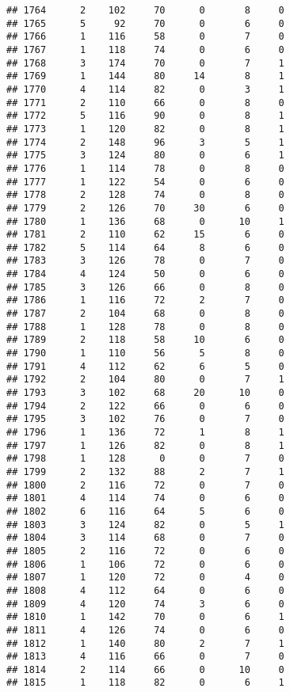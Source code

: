 \documentclass[
]{article}
\begin{document}
\begin{verbatim}
## 1764      2    102     70      0       8     0
## 1765      5     92     70      0       6     0
## 1766      1    116     58      0       7     0
## 1767      1    118     74      0       6     0
## 1768      3    174     70      0       7     1
## 1769      1    144     80     14       8     1
## 1770      4    114     82      0       3     1
## 1771      2    110     66      0       8     0
## 1772      5    116     90      0       8     1
## 1773      1    120     82      0       8     1
## 1774      2    148     96      3       5     1
## 1775      3    124     80      0       6     1
## 1776      1    114     78      0       8     0
## 1777      1    122     54      0       6     0
## 1778      2    128     74      0       8     0
## 1779      2    126     70     30       6     0
## 1780      1    136     68      0      10     1
## 1781      2    110     62     15       6     0
## 1782      5    114     64      8       6     0
## 1783      3    126     78      0       7     0
## 1784      4    124     50      0       6     0
## 1785      3    126     66      0       8     0
## 1786      1    116     72      2       7     0
## 1787      2    104     68      0       8     0
## 1788      1    128     78      0       8     0
## 1789      2    118     58     10       6     0
## 1790      1    110     56      5       8     0
## 1791      4    112     62      6       5     0
## 1792      2    104     80      0       7     1
## 1793      3    102     68     20      10     0
## 1794      2    122     66      0       6     0
## 1795      3    102     76      0       7     0
## 1796      1    136     72      1       8     1
## 1797      1    126     82      0       8     1
## 1798      1    128      0      0       7     0
## 1799      2    132     88      2       7     1
## 1800      2    116     72      0       7     0
## 1801      4    114     74      0       6     0
## 1802      6    116     64      5       6     0
## 1803      3    124     82      0       5     1
## 1804      3    114     68      0       7     0
## 1805      2    116     72      0       6     0
## 1806      1    106     72      0       6     0
## 1807      1    120     72      0       4     0
## 1808      4    112     64      0       6     0
## 1809      4    120     74      3       6     0
## 1810      1    142     70      0       6     1
## 1811      4    126     74      0       6     0
## 1812      1    140     80      2       7     1
## 1813      4    116     66      0       7     0
## 1814      2    114     66      0      10     0
## 1815      1    118     82      0       6     1

\end{verbatim}
\end{document}
